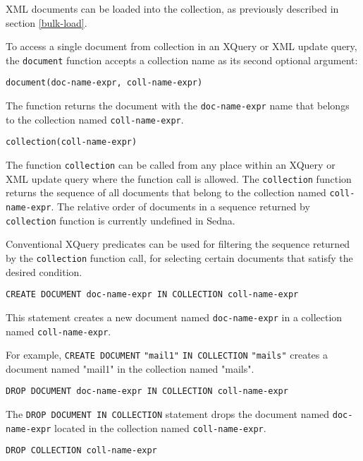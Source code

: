 \documentclass[a4paper,12pt]{article}
\begin{document}
XML documents can be loaded into the collection, as previously described in
section \ref{bulk-load}.

To access a single document from collection in an XQuery or XML update query,
the \verb!document! function accepts a collection name as its second optional
argument:

\begin{verbatim}document(doc-name-expr, coll-name-expr)\end{verbatim}

The function returns the document with
the \verb!doc-name-expr! name that belongs to the collection named \verb!coll-name-expr!.

\begin{verbatim}collection(coll-name-expr)\end{verbatim}

The function \verb!collection! can be called from any place within an XQuery or
XML update query where the function call is allowed.
The \verb!collection! function returns the sequence of all documents that
belong to the collection named \verb!coll-name-expr!.
The relative order of documents in a sequence returned by \verb!collection!
function is currently undefined in Sedna.

Conventional XQuery predicates can be used for filtering the sequence returned
by the \verb!collection! function call, for selecting certain documents that
satisfy the desired condition.

\begin{verbatim}
CREATE DOCUMENT doc-name-expr IN COLLECTION coll-name-expr
\end{verbatim}

This statement creates a new document named \verb!doc-name-expr! in a collection named \verb!coll-name-expr!.

For example, \verb!CREATE DOCUMENT! \verb!"mail1"! \verb!IN COLLECTION! \verb!"mails"! creates a document named "mail1" in the collection named "mails".

\begin{verbatim}DROP DOCUMENT doc-name-expr IN COLLECTION coll-name-expr\end{verbatim}

The \verb!DROP DOCUMENT IN COLLECTION! statement drops the document named
\verb!doc-name-expr! located in the collection named \verb!coll-name-expr!.

\begin{verbatim}DROP COLLECTION coll-name-expr\end{verbatim}
\end{document}

